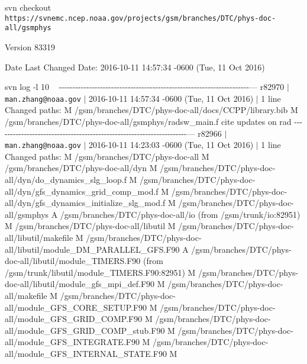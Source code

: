 
\begin{DoxyItemize}
\item svn checkout {\tt https\+://svnemc.\+ncep.\+noaa.\+gov/projects/gsm/branches/\+D\+T\+C/phys-\/doc-\/all/gsmphys}
\item \begin{DoxyVersion}{Version}
83319
\end{DoxyVersion}

\item \begin{DoxyDate}{Date}
Last Changed Date\+: 2016-\/10-\/11 14\+:57\+:34 -\/0600 (Tue, 11 Oct 2016)
\end{DoxyDate}

\item svn log -\/l 10 ~\newline
 -\/-\/-\/-\/-\/-\/-\/-\/-\/-\/-\/-\/-\/-\/-\/-\/-\/-\/-\/-\/-\/-\/-\/-\/-\/-\/-\/-\/-\/-\/-\/-\/-\/-\/-\/-\/-\/-\/-\/-\/-\/-\/-\/-\/-\/-\/-\/-\/-\/-\/-\/-\/-\/-\/-\/-\/-\/-\/-\/-\/-\/-\/-\/-\/-\/-\/-\/-\/-\/--- r82970 $\vert$ {\tt man.\+zhang@noaa.\+gov} $\vert$ 2016-\/10-\/11 14\+:57\+:34 -\/0600 (Tue, 11 Oct 2016) $\vert$ 1 line Changed paths\+: M /gsm/branches/\+D\+T\+C/phys-\/doc-\/all/docs/\+C\+C\+P\+P/library.bib M /gsm/branches/\+D\+T\+C/phys-\/doc-\/all/gsmphys/radsw\+\_\+main.f cite updates on rad -\/-\/-\/-\/-\/-\/-\/-\/-\/-\/-\/-\/-\/-\/-\/-\/-\/-\/-\/-\/-\/-\/-\/-\/-\/-\/-\/-\/-\/-\/-\/-\/-\/-\/-\/-\/-\/-\/-\/-\/-\/-\/-\/-\/-\/-\/-\/-\/-\/-\/-\/-\/-\/-\/-\/-\/-\/-\/-\/-\/-\/-\/-\/-\/-\/-\/-\/-\/-\/--- r82966 $\vert$ {\tt man.\+zhang@noaa.\+gov} $\vert$ 2016-\/10-\/11 14\+:23\+:03 -\/0600 (Tue, 11 Oct 2016) $\vert$ 1 line Changed paths\+: M /gsm/branches/\+D\+T\+C/phys-\/doc-\/all M /gsm/branches/\+D\+T\+C/phys-\/doc-\/all/dyn M /gsm/branches/\+D\+T\+C/phys-\/doc-\/all/dyn/do\+\_\+dynamics\+\_\+slg\+\_\+loop.f M /gsm/branches/\+D\+T\+C/phys-\/doc-\/all/dyn/gfs\+\_\+dynamics\+\_\+grid\+\_\+comp\+\_\+mod.f M /gsm/branches/\+D\+T\+C/phys-\/doc-\/all/dyn/gfs\+\_\+dynamics\+\_\+initialize\+\_\+slg\+\_\+mod.f M /gsm/branches/\+D\+T\+C/phys-\/doc-\/all/gsmphys A /gsm/branches/\+D\+T\+C/phys-\/doc-\/all/io (from /gsm/trunk/io\+:82951) M /gsm/branches/\+D\+T\+C/phys-\/doc-\/all/libutil M /gsm/branches/\+D\+T\+C/phys-\/doc-\/all/libutil/makefile M /gsm/branches/\+D\+T\+C/phys-\/doc-\/all/libutil/module\+\_\+\+D\+M\+\_\+\+P\+A\+R\+A\+L\+L\+E\+L\+\_\+\+G\+FS.F90 A /gsm/branches/\+D\+T\+C/phys-\/doc-\/all/libutil/module\+\_\+\+T\+I\+M\+E\+RS.F90 (from /gsm/trunk/libutil/module\+\_\+\+T\+I\+M\+E\+RS.F90\+:82951) M /gsm/branches/\+D\+T\+C/phys-\/doc-\/all/libutil/module\+\_\+gfs\+\_\+mpi\+\_\+def.F90 M /gsm/branches/\+D\+T\+C/phys-\/doc-\/all/makefile M /gsm/branches/\+D\+T\+C/phys-\/doc-\/all/module\+\_\+\+G\+F\+S\+\_\+\+C\+O\+R\+E\+\_\+\+S\+E\+T\+UP.F90 M /gsm/branches/\+D\+T\+C/phys-\/doc-\/all/module\+\_\+\+G\+F\+S\+\_\+\+G\+R\+I\+D\+\_\+\+C\+O\+MP.F90 M /gsm/branches/\+D\+T\+C/phys-\/doc-\/all/module\+\_\+\+G\+F\+S\+\_\+\+G\+R\+I\+D\+\_\+\+C\+O\+M\+P\+\_\+stub.F90 M /gsm/branches/\+D\+T\+C/phys-\/doc-\/all/module\+\_\+\+G\+F\+S\+\_\+\+I\+N\+T\+E\+G\+R\+A\+TE.F90 M /gsm/branches/\+D\+T\+C/phys-\/doc-\/all/module\+\_\+\+G\+F\+S\+\_\+\+I\+N\+T\+E\+R\+N\+A\+L\+\_\+\+S\+T\+A\+TE.F90 M 
\end{DoxyItemize}
